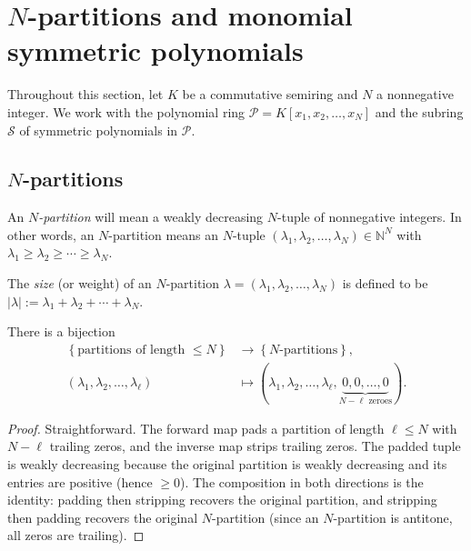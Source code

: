 \section{$N$-partitions and monomial symmetric polynomials}

Throughout this section, let $K$ be a commutative semiring and $N$ a nonnegative integer.
We work with the polynomial ring $\mathcal{P} = K[x_1, x_2, \ldots, x_N]$
and the subring $\mathcal{S}$ of symmetric polynomials in $\mathcal{P}$.

\subsection{$N$-partitions}

\begin{definition}
\label{def.sf.Npar}
\leantarget
\leanok
An $N$\emph{-partition} will mean a weakly decreasing
$N$-tuple of nonnegative integers. In other words, an $N$-partition means an
$N$-tuple $\left(  \lambda_{1},\lambda_{2},\ldots,\lambda_{N}\right)
\in\mathbb{N}^{N}$ with $\lambda_{1}\geq\lambda_{2}\geq\cdots\geq\lambda_{N}$.

The \emph{size} (or weight) of an $N$-partition $\lambda = (\lambda_1, \lambda_2, \ldots, \lambda_N)$
is defined to be $|\lambda| := \lambda_1 + \lambda_2 + \cdots + \lambda_N$.
\end{definition}

\begin{proposition}
\label{prop.sf.Npar-as-par}
\leantarget
\leanok
There is a bijection%
\begin{align*}
\left\{  \text{partitions of length }\leq N\right\}   &  \rightarrow\left\{
N\text{-partitions}\right\}  ,\\
\left(  \lambda_{1},\lambda_{2},\ldots,\lambda_{\ell}\right)   &
\mapsto\left(  \lambda_{1},\lambda_{2},\ldots,\lambda_{\ell}%
,\underbrace{0,0,\ldots,0}_{N-\ell\text{ zeroes}}\right)  .
\end{align*}
\end{proposition}

\begin{proof}
Straightforward. The forward map pads a partition of length $\ell \leq N$ with
$N - \ell$ trailing zeros, and the inverse map strips trailing zeros. The
padded tuple is weakly decreasing because the original partition is weakly
decreasing and its entries are positive (hence $\geq 0$). The composition in both
directions is the identity: padding then stripping recovers the original
partition, and stripping then padding recovers the original $N$-partition
(since an $N$-partition is antitone, all zeros are trailing).
\end{proof}

